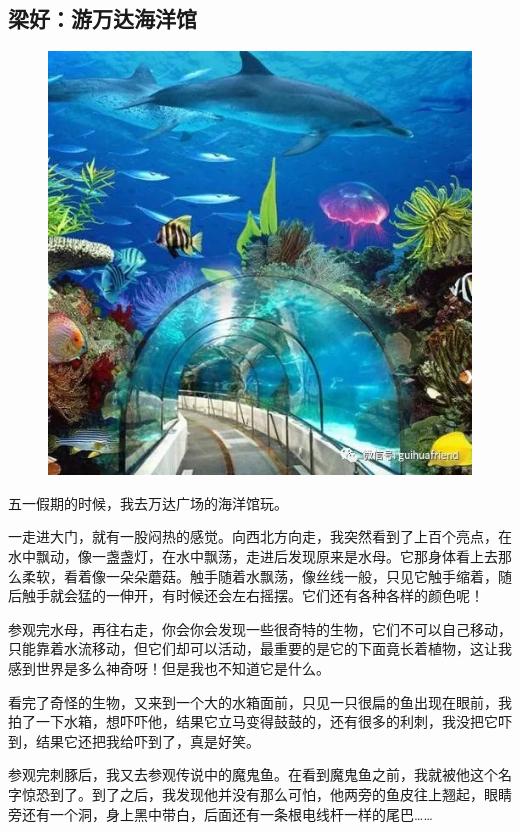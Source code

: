 \vspace{10pt}

{\centering\subsection*{梁好：游万达海洋馆}}


\renewcommand{\leftmark}{梁好：游万达海洋馆}

\begin{figure}[htbp]

\centering

\includegraphics[width = .5\textwidth]{./ch/14.jpg}

\end{figure}



五一假期的时候，我去万达广场的海洋馆玩。

一走进大门，就有一股闷热的感觉。向西北方向走，我突然看到了上百个亮点，在水中飘动，像一盏盏灯，在水中飘荡，走进后发现原来是水母。它那身体看上去那么柔软，看着像一朵朵蘑菇。触手随着水飘荡，像丝线一般，只见它触手缩着，随后触手就会猛的一伸开，有时候还会左右摇摆。它们还有各种各样的颜色呢！

参观完水母，再往右走，你会你会发现一些很奇特的生物，它们不可以自己移动，只能靠着水流移动，但它们却可以活动，最重要的是它的下面竟长着植物，这让我感到世界是多么神奇呀！但是我也不知道它是什么。

看完了奇怪的生物，又来到一个大的水箱面前，只见一只很扁的鱼出现在眼前，我拍了一下水箱，想吓吓他，结果它立马变得鼓鼓的，还有很多的利刺，我没把它吓到，结果它还把我给吓到了，真是好笑。

参观完刺豚后，我又去参观传说中的魔鬼鱼。在看到魔鬼鱼之前，我就被他这个名字惊恐到了。到了之后，我发现他并没有那么可怕，他两旁的鱼皮往上翘起，眼睛旁还有一个洞，身上黑中带白，后面还有一条根电线杆一样的尾巴……

